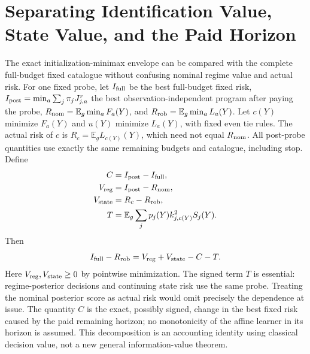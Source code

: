 \section{Separating Identification Value, State Value, and the Paid Horizon}
The exact initialization-minimax envelope can be compared with the complete
full-budget fixed catalogue without confusing nominal regime value and actual risk.
For one fixed probe, let $I_{\rm full}$ be the best full-budget fixed risk,
$I_{\rm post}=\min_a\sum_j\pi_jJ_{j,a}^{r}$ the best observation-independent
program after paying the probe, $R_{\rm nom}=\mathbb E_g\min_aF_a(Y)$,
and $R_{\rm rob}=\mathbb E_g\min_aL_a(Y)$.
Let $c(Y)$ minimize $F_a(Y)$ and $u(Y)$ minimize $L_a(Y)$, with fixed even tie
rules. The actual risk of $c$ is $R_c=\mathbb E_gL_{c(Y)}(Y)$, which need not
equal $R_{\rm nom}$.
All post-probe quantities use exactly the same remaining budgets and catalogue,
including stop.
Define
\begin{align*}
C&=I_{\rm post}-I_{\rm full},\\
V_{\rm reg}&=I_{\rm post}-R_{\rm nom},\\
V_{\rm state}&=R_c-R_{\rm rob},\\
T&=\mathbb E_g\sum_jp_j(Y)k_{j,c(Y)}^2S_j(Y).
\end{align*}
Then
\begin{equation}
I_{\rm full}-R_{\rm rob}=V_{\rm reg}+V_{\rm state}-C-T.
\label{eq:research-value-decomposition}
\end{equation}
Here $V_{\rm reg},V_{\rm state}\ge0$ by pointwise minimization.
The signed term $T$ is essential: regime-posterior decisions and continuing
state risk use the same probe. Treating the nominal posterior score as actual
risk would omit precisely the dependence at issue.
The quantity $C$ is the exact, possibly signed, change in the best
fixed risk caused by the paid remaining horizon; no monotonicity of the affine
learner in its horizon is assumed.
This decomposition is an accounting identity using classical decision value,
not a new general information-value theorem.

